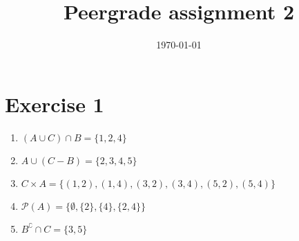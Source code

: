 \documentclass[a4paper,11pt]{article}
\title{Peergrade assignment 2}
\author{}
\date{\today}
\begin{document}
\maketitle

\section*{Exercise 1}
\begin{enumerate}
    \item $(A \cup C) \cap B = \{1, 2, 4\}$
    \item $A \cup (C - B) = \{2, 3, 4, 5\}$
    \item $C \times A = \{(1, 2), (1, 4), (3, 2), (3, 4), (5, 2), (5, 4)\}$
    \item $\mathcal{P}(A) = \{\emptyset, \{2\}, \{4\}, \{2, 4\}\}$
    \item $B^\complement \cap C = \{3, 5\}$\\
\end{enumerate}
\end{document}
